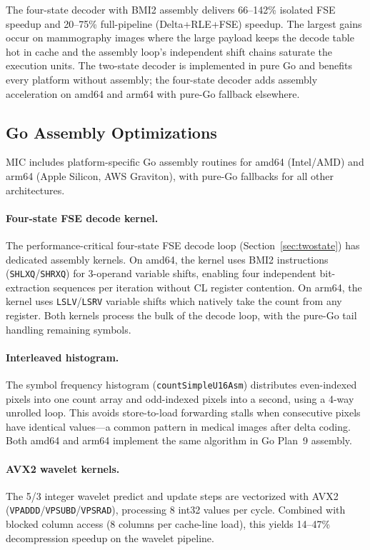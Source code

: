 \documentclass[11pt,twocolumn]{article}
\begin{document}
The four-state decoder with BMI2 assembly delivers 66--142\% isolated FSE speedup and 20--75\% full-pipeline (Delta+RLE+FSE) speedup.
The largest gains occur on mammography images where the large payload keeps the decode table hot in cache and the assembly loop's independent shift chains saturate the execution units.
The two-state decoder is implemented in pure Go and benefits every platform without assembly; the four-state decoder adds assembly acceleration on amd64 and arm64 with pure-Go fallback elsewhere.

\subsection{Go Assembly Optimizations}
\label{sec:assembly}

MIC includes platform-specific Go assembly routines for amd64 (Intel/AMD) and arm64 (Apple Silicon, AWS Graviton), with pure-Go fallbacks for all other architectures.

\paragraph{Four-state FSE decode kernel.}
The performance-critical four-state FSE decode loop (Section~\ref{sec:twostate}) has dedicated assembly kernels.
On amd64, the kernel uses BMI2 instructions (\texttt{SHLXQ}/\texttt{SHRXQ}) for 3-operand variable shifts, enabling four independent bit-extraction sequences per iteration without CL register contention.
On arm64, the kernel uses \texttt{LSLV}/\texttt{LSRV} variable shifts which natively take the count from any register.
Both kernels process the bulk of the decode loop, with the pure-Go tail handling remaining symbols.

\paragraph{Interleaved histogram.}
The symbol frequency histogram (\texttt{countSimpleU16Asm}) distributes even-indexed pixels into one count array and odd-indexed pixels into a second, using a 4-way unrolled loop.
This avoids store-to-load forwarding stalls when consecutive pixels have identical values---a common pattern in medical images after delta coding.
Both amd64 and arm64 implement the same algorithm in Go Plan~9 assembly.

\paragraph{AVX2 wavelet kernels.}
The 5/3 integer wavelet predict and update steps are vectorized with AVX2 (\texttt{VPADDD}/\texttt{VPSUBD}/\texttt{VPSRAD}), processing 8 int32 values per cycle.
Combined with blocked column access (8 columns per cache-line load), this yields 14--47\% decompression speedup on the wavelet pipeline.
\end{document}
